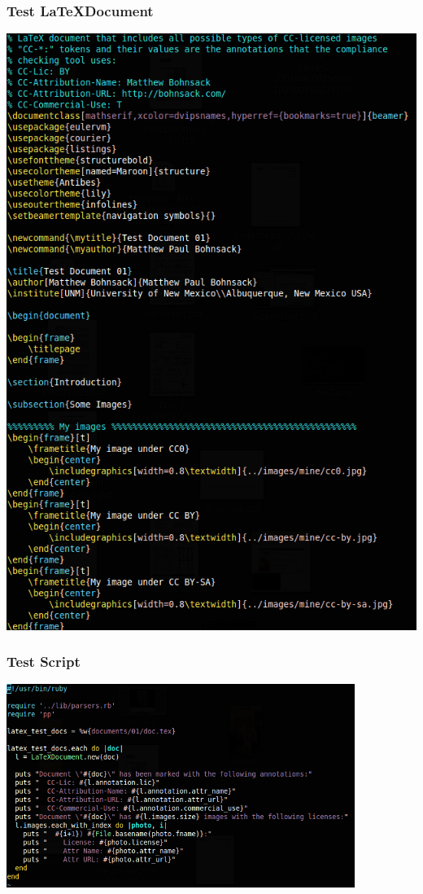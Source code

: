 \documentclass[mathserif,xcolor=dvipsnames,handout]{beamer}
\begin{document}
    \begin{frame}[t]
        \frametitle{Test \LaTeX Document}
        \begin{center}
            \includegraphics[height=0.85\textheight]{test-document.png}
        \end{center}
    \end{frame}

    \begin{frame}[t]
        \frametitle{Test Script}
        \begin{center}
            \includegraphics[width=0.85\textwidth]{test.png}
        \end{center}
    \end{frame}
\end{document}

